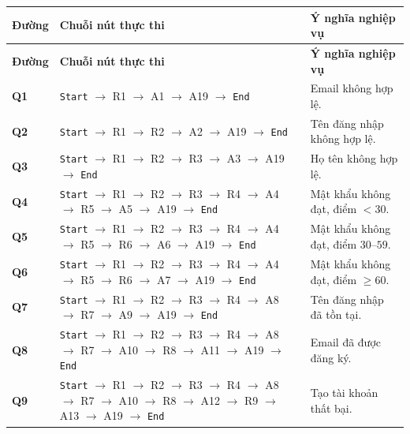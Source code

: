 \documentclass[11pt,a4paper]{article}
\begin{document}
\begin{longtable}{|C{1.3cm}|L{8.3cm}|L{6.2cm}|}
\hline
{}
\textbf{Đường} & \textbf{Chuỗi nút thực thi} & \textbf{Ý nghĩa nghiệp vụ} \tabularnewline
\hline
\endfirsthead
\hline
{}
\textbf{Đường} & \textbf{Chuỗi nút thực thi} & \textbf{Ý nghĩa nghiệp vụ} \tabularnewline
\hline
\endhead
\hline
\endfoot
\textbf{Q1} & \texttt{Start} $\rightarrow$ R1 $\rightarrow$ A1 $\rightarrow$ A19 $\rightarrow$ \texttt{End} & Email không hợp lệ. \\ \hline
\textbf{Q2} & \texttt{Start} $\rightarrow$ R1 $\rightarrow$ R2 $\rightarrow$ A2 $\rightarrow$ A19 $\rightarrow$ \texttt{End} & Tên đăng nhập không hợp lệ. \\ \hline
\textbf{Q3} & \texttt{Start} $\rightarrow$ R1 $\rightarrow$ R2 $\rightarrow$ R3 $\rightarrow$ A3 $\rightarrow$ A19 $\rightarrow$ \texttt{End} & Họ tên không hợp lệ. \\ \hline
\textbf{Q4} & \texttt{Start} $\rightarrow$ R1 $\rightarrow$ R2 $\rightarrow$ R3 $\rightarrow$ R4 $\rightarrow$ A4 $\rightarrow$ R5 $\rightarrow$ A5 $\rightarrow$ A19 $\rightarrow$ \texttt{End} & Mật khẩu không đạt, điểm $< 30$. \\ \hline
\textbf{Q5} & \texttt{Start} $\rightarrow$ R1 $\rightarrow$ R2 $\rightarrow$ R3 $\rightarrow$ R4 $\rightarrow$ A4 $\rightarrow$ R5 $\rightarrow$ R6 $\rightarrow$ A6 $\rightarrow$ A19 $\rightarrow$ \texttt{End} & Mật khẩu không đạt, điểm $30\text{--}59$. \\ \hline
\textbf{Q6} & \texttt{Start} $\rightarrow$ R1 $\rightarrow$ R2 $\rightarrow$ R3 $\rightarrow$ R4 $\rightarrow$ A4 $\rightarrow$ R5 $\rightarrow$ R6 $\rightarrow$ A7 $\rightarrow$ A19 $\rightarrow$ \texttt{End} & Mật khẩu không đạt, điểm $\ge 60$. \\ \hline
\textbf{Q7} & \texttt{Start} $\rightarrow$ R1 $\rightarrow$ R2 $\rightarrow$ R3 $\rightarrow$ R4 $\rightarrow$ A8 $\rightarrow$ R7 $\rightarrow$ A9 $\rightarrow$ A19 $\rightarrow$ \texttt{End} & Tên đăng nhập đã tồn tại. \\ \hline
\textbf{Q8} & \texttt{Start} $\rightarrow$ R1 $\rightarrow$ R2 $\rightarrow$ R3 $\rightarrow$ R4 $\rightarrow$ A8 $\rightarrow$ R7 $\rightarrow$ A10 $\rightarrow$ R8 $\rightarrow$ A11 $\rightarrow$ A19 $\rightarrow$ \texttt{End} & Email đã được đăng ký. \\ \hline
\textbf{Q9} & \texttt{Start} $\rightarrow$ R1 $\rightarrow$ R2 $\rightarrow$ R3 $\rightarrow$ R4 $\rightarrow$ A8 $\rightarrow$ R7 $\rightarrow$ A10 $\rightarrow$ R8 $\rightarrow$ A12 $\rightarrow$ R9 $\rightarrow$ A13 $\rightarrow$ A19 $\rightarrow$ \texttt{End} & Tạo tài khoản thất bại. \\ \hline

\end{longtable}
\end{document}
